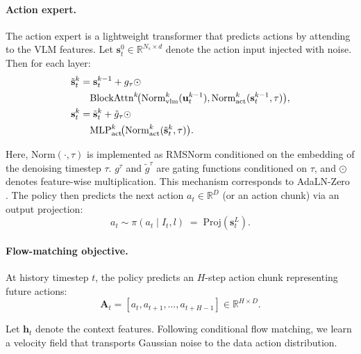 \paragraph{Action expert.}
The action expert is a lightweight transformer that predicts actions by attending to the VLM features.
Let $\mathbf{s}_t^{0} \in \mathbb{R}^{N_s \times d}$ denote the action input injected with noise. Then for each layer:
\begin{align}
\tilde{\mathbf{s}}_t^{k}
&=
\mathbf{s}_t^{k-1} +
g_{\tau} \odot
\notag\\
&\quad
\mathrm{BlockAttn}^{k}\!\big(
\mathrm{Norm}_\text{vlm}^{k}(\mathbf{u}_t^{k-1}),
\mathrm{Norm}_\text{act}^{k}(\mathbf{s}_t^{k-1}, \tau)
\big), 
\label{eq:act_attn}\\
\mathbf{s}_t^{k}
&=
\tilde{\mathbf{s}}_t^{k} +
\tilde{g}_{\tau} \odot
\notag\\
&\quad
\mathrm{MLP}_{\text{act}}^{k}\!\big(
\mathrm{Norm}_\text{act}^{k}(\tilde{\mathbf{s}}_t^{k}, \tau)
\big).
\label{eq:act_mlp}
\end{align}

Here, $\mathrm{Norm}(\cdot, \tau)$ is implemented as RMSNorm conditioned on the embedding of the denoising timestep $\tau$.
$g^\tau$ and $\tilde{g}^\tau$ are gating functions conditioned on $\tau$, and $\odot$ denotes feature-wise multiplication.
This mechanism corresponds to AdaLN-Zero \cite{peebles2023scalable}.
The policy then predicts the next action $a_t \in \mathbb{R}^{D}$ (or an action chunk) via an output projection:
\begin{equation}
a_t \sim \pi(a_t \mid I_t, l) \;=\; \mathrm{Proj}(\mathbf{s}_t^{L}).
\end{equation}

\paragraph{Flow-matching objective.}

At history timestep $t$, the policy predicts an $H$-step action chunk representing future actions:
\begin{equation}
\mathbf{A}_t = [a_t, a_{t+1}, \dots, a_{t+H-1}] \in \mathbb{R}^{H \times D}.
\end{equation}

Let $\mathbf{h}_t$ denote the context features. 
Following conditional flow matching, we learn a velocity field that transports Gaussian noise to the data action distribution.

